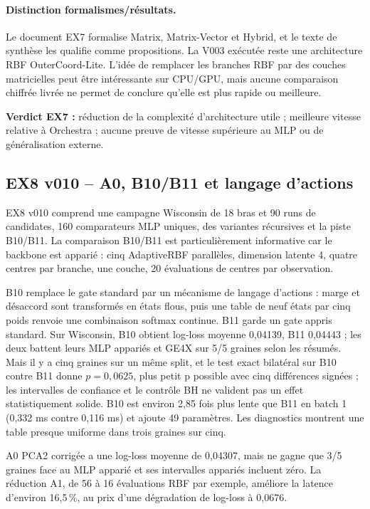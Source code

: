 \documentclass[11pt,a4paper]{article}
\begin{document}
\paragraph{Distinction formalismes/résultats.} Le document EX7 formalise Matrix, Matrix-Vector et Hybrid, et le texte de synthèse les qualifie comme propositions. La V003 exécutée reste une architecture RBF OuterCoord-Lite. L'idée de remplacer les branches RBF par des couches matricielles peut être intéressante sur CPU/GPU, mais aucune comparaison chiffrée livrée ne permet de conclure qu'elle est plus rapide ou meilleure.

\textbf{Verdict EX7 :} réduction de la complexité d'architecture utile ; meilleure vitesse relative à Orchestra ; aucune preuve de vitesse supérieure au MLP ou de généralisation externe.

\subsection{EX8 v010 -- A0, B10/B11 et langage d'actions}

EX8 v010 comprend une campagne Wisconsin de 18 bras et 90 runs de candidates, 160 comparateurs MLP uniques, des variantes récursives et la piste B10/B11. La comparaison B10/B11 est particulièrement informative car le backbone est apparié : cinq AdaptiveRBF parallèles, dimension latente 4, quatre centres par branche, une couche, 20 évaluations de centres par observation.

B10 remplace le gate standard par un mécanisme de langage d'actions : marge et désaccord sont transformés en états flous, puis une table de neuf états par cinq poids renvoie une combinaison softmax continue. B11 garde un gate appris standard. Sur Wisconsin, B10 obtient log-loss moyenne 0,04139, B11 0,04443 ; les deux battent leurs MLP appariés et GE4X sur 5/5 graines selon les résumés. Mais il y a cinq graines sur un même split, et le test exact bilatéral sur B10 contre B11 donne \(p=0,0625\), plus petit p possible avec cinq différences signées ; les intervalles de confiance et le contrôle BH ne valident pas un effet statistiquement solide. B10 est environ 2,85 fois plus lente que B11 en batch 1 (0,332 ms contre 0,116 ms) et ajoute 49 paramètres. Les diagnostics montrent une table presque uniforme dans trois graines sur cinq.

A0 PCA2 corrigée a une log-loss moyenne de 0,04307, mais ne gagne que 3/5 graines face au MLP apparié et ses intervalles appariés incluent zéro. La réduction A1, de 56 à 16 évaluations RBF par exemple, améliore la latence d'environ 16,5\,\%, au prix d'une dégradation de log-loss à 0,0676.
\end{document}
